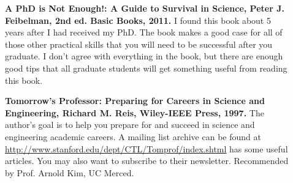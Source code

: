 \documentclass[11pt]{article}
\begin{document}
\begin{description}
\item[] {\bf A PhD is Not Enough!: A Guide to Survival in Science, Peter J. Feibelman, 2nd ed. Basic Books, 2011.} I found this book about 5 years after I had received my PhD.  The book makes a good case for all of those other practical skills that you will need to be successful after you graduate.  I don't agree with everything in the book, but there are enough good tips that all graduate students will get something useful from reading this book.

\item[] {\bf Tomorrow's Professor: Preparing for Careers in Science and Engineering, Richard M. Reis, Wiley-IEEE Press, 1997.}  The author's goal is to help you prepare for and succeed in science and engineering academic careers. A mailing list archive can be found at \url{http://www.stanford.edu/dept/CTL/Tomprof/index.shtml} has some useful articles. You may also want to subscribe to their newsletter.  Recommended by Prof. Arnold Kim, UC Merced. 

\end{description}
\end{document}
